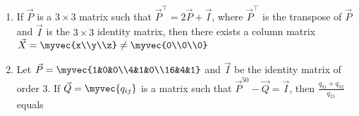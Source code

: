 \begin{enumerate}
            \item If $\vec{P}$ is a $3 \times 3$ matrix such that $\vec{P}^{\top} = 2\vec{P} +\vec{I}$, where $\vec{P}^{\top}$ is the transpose of $\vec{P}$ and $\vec{I}$ is the $3 \times 3$ identity matrix, then there exists a column matrix $\vec{X}=\myvec{x\\y\\z} \neq \myvec{0\\0\\0}$
                \hfill{}
                \begin{enumerate}

                \end{enumerate}

            \item Let $\vec{P}=\myvec{1&0&0\\4&1&0\\16&4&1}$ and $\vec{I}$ be the identity matrix of order 3. If $\vec{Q} = \myvec{q_{ij}}$ is a matrix such that $\vec{P}^{50} -\vec{Q} =\vec{I}$, then $\frac{q_{31}+q_{32}}{q_{21}}$ equals
                \hfill{}
                \begin{enumerate}

                \end{enumerate}


\end{enumerate}

